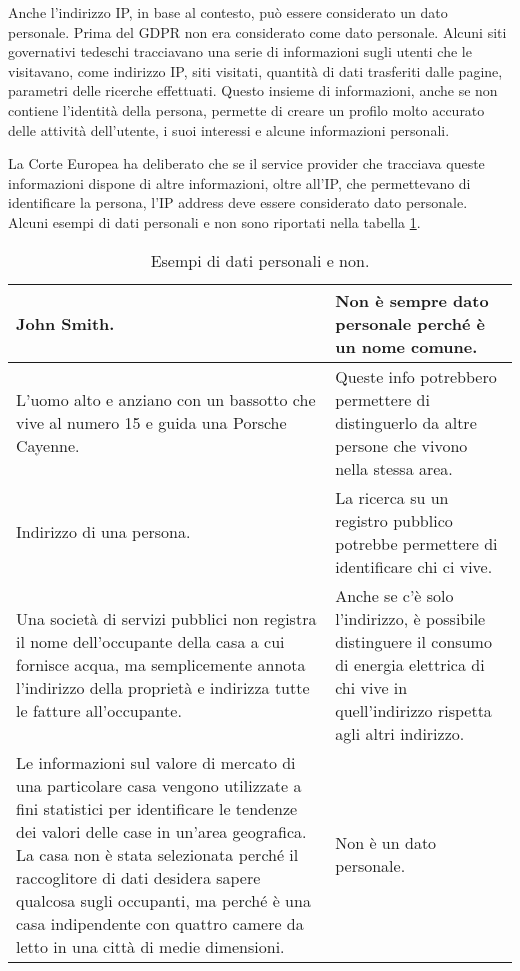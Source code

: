 \noindent Anche l'indirizzo IP, in base al contesto, può essere considerato un dato personale. Prima del GDPR non era considerato come dato personale. Alcuni siti governativi tedeschi tracciavano una serie di informazioni sugli utenti che le visitavano, come indirizzo IP, siti visitati, quantità di dati trasferiti dalle pagine, parametri delle ricerche effettuati. Questo insieme di informazioni, anche se non contiene l'identità della persona, permette di creare un profilo molto accurato delle attività dell'utente, i suoi interessi e alcune informazioni personali.

La Corte Europea ha deliberato che se il service provider che tracciava queste informazioni dispone di altre informazioni, oltre all'IP, che permettevano di identificare la persona, l'IP address deve essere considerato dato personale.
\\

\noindent Alcuni esempi di dati personali e non sono riportati nella tabella \ref{table:table13-1}.


\begin{table}
\centering
\begin{tabular}{|p{}p{}|}
     \hline
     John Smith. & Non è sempre dato personale perché è un nome comune.\\ 
     \hline
     L'uomo alto e anziano con un bassotto che vive al numero 15 e guida una Porsche Cayenne. & Queste info potrebbero permettere di distinguerlo da altre persone che vivono nella stessa area.\\  
     \hline
     Indirizzo di una persona. & La ricerca su un registro pubblico potrebbe permettere di identificare chi ci vive.\\
     \hline
     Una società di servizi pubblici non registra il nome dell'occupante della casa a cui fornisce acqua, ma semplicemente annota l'indirizzo della proprietà e indirizza tutte le fatture all'occupante. & Anche se c'è solo l'indirizzo, è possibile distinguere il consumo di energia elettrica di chi vive in quell'indirizzo rispetta agli altri indirizzo.\\
     \hline
     Le informazioni sul valore di mercato di una particolare casa vengono utilizzate a fini statistici per identificare le tendenze dei valori delle case in un'area geografica. La casa non è stata selezionata perché il raccoglitore di dati desidera sapere qualcosa sugli occupanti, ma perché è una casa indipendente con quattro camere da letto in una città di medie dimensioni. & Non è un dato personale.\\
     \hline
\end{tabular}
\caption{Esempi di dati personali e non.}
\label{table:table13-1}
\end{table}

